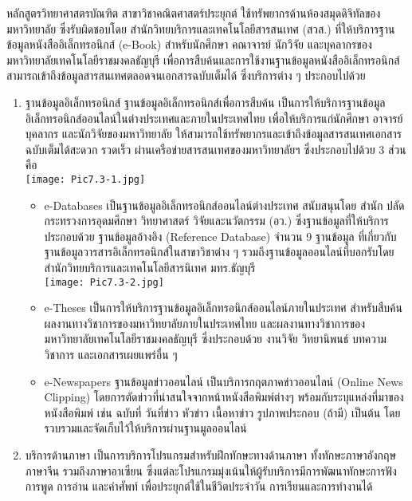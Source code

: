 หลักสูตรวิทยาศาสตรบัณฑิต สาขาวิชาคณิตศาสตร์ประยุกต์ ใช้ทรัพยากรด้านห้องสมุดดิจิทัลของ
มหาวิทยาลัย ซึ่งรับผิดชอบโดย สำนักวิทยบริการและเทคโนโลยีสารสนเทศ (สวส.) ที่ให้บริการฐานข้อมูลหนังสืออิเล็กทรอนิกส์ (e-Book) สำหรับนักศึกษา คณาจารย์ นักวิจัย และบุคลากรของมหาวิทยาลัยเทคโนโลยีราชมงคลธัญบุรี เพื่อการสืบค้นและการใช้งานฐานข้อมูลหนังสืออิเล็กทรอนิกส์สามารถเข้าถึงข้อมูลสารสนเทศตลอดจนเอกสารฉบับเต็มได้ ซึ่งบริการต่าง ๆ ประกอบไปด้วย
\begin{enumerate}
\item ฐานข้อมูลอิเล็กทรอนิกส์ ฐานข้อมูลอิเล็กทรอนิกส์เพื่อการสืบค้น เป็นการให้บริการฐานข้อมูล
อิเล็กทรอนิกส์ออนไลน์ในต่างประเทศและภายในประเทศไทย เพื่อให้บริการแก่นักศึกษา อาจารย์ บุคลากร และนักวิจัยของมหาวิทยาลัย ให้สามารถใช้ทรัพยากรและเข้าถึงข้อมูลสารสนเทศเอกสารฉบับเต็มได้สะดวก รวดเร็ว ผ่านเครือข่ายสารสนเทศของมหาวิทยาลัยฯ  ซึ่งประกอบไปด้วย 3 ส่วนคือ \\[0.2cm]
\texttt{[image: Pic7.3-1.jpg]}
\begin{itemize}
	\item e-Databases เป็นฐานข้อมูลอิเล็กทรอนิกส์ออนไลน์ต่างประเทศ สนับสนุนโดย สำนัก
	ปลัดกระทรวงการอุดมศึกษา วิทยาศาสตร์ วิจัยและนวัตกรรม (อว.) ซึ่งฐานข้อมูลที่ให้บริการประกอบด้วย ฐานข้อมูลอ้างอิง (Reference Database) จำนวน 9 ฐานข้อมูล ที่เกี่ยวกับฐานข้อมูลวารสารอิเล็กทรอนิกส์ในสาขาวิชาต่าง ๆ รวมถึงฐานข้อมูลออนไลน์ที่บอกรับโดย สำนักวิทยบริการและเทคโนโลยีสารนิเทศ มทร.ธัญบุรี
	\\[0.2cm]
	\texttt{[image: Pic7.3-2.jpg]}\\
	\item e-Theses เป็นการให้บริการฐานข้อมูลอิเล็กทรอนิกส์ออนไลน์ภายในประเทศ สำหรับสืบค้น
	ผลงานทางวิชาการของมหาวิทยาลัยภายในประเทศไทย และผลงานทางวิชาการของมหาวิทยาลัยเทคโนโลยีราชมงคลธัญบุรี ซึ่งประกอบด้วย งานวิจัย วิทยานิพนธ์ บทความวิชาการ และเอกสารเผยแพร่อื่น ๆ
	\item e-Newspapers ฐานข้อมูลข่าวออนไลน์ เป็นบริการกฤตภาคข่าวออนไลน์ (Online News 
	Clipping) โดยการตัดข่าวที่น่าสนใจจากหน้าหนังสือพิมพ์ต่างๆ พร้อมกับระบุแหล่งที่มาของหนังสือพิมพ์ เช่น ฉบับที่ วันที่ข่าว หัวข่าว เนื้อหาข่าว รูปภาพประกอบ (ถ้ามี) เป็นต้น โดยรวบรวมและจัดเก็บไว้ให้บริการผ่านฐานมูลออนไลน์
\end{itemize}
\item บริการด้านภาษา เป็นการบริการโปรแกรมสำหรับฝึกทักษะทางด้านภาษา ทั้งทักษะภาษาอังกฤษ 
ภาษาจีน รวมถึงภาษาอาเซียน ซึ่งแต่ละโปรแกรมมุ่งเน้นให้ผู้รับบริการมีการพัฒนาทักษะการฟัง การพูด การอ่าน และคำศัพท์ เพื่อประยุกต์ใช้ในชีวิตประจำวัน การเรียนและการทำงานได้
\\

\end{enumerate}

